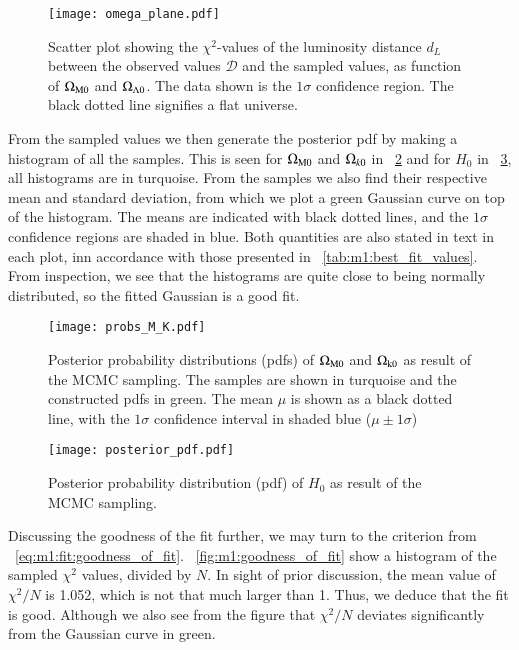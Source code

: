     \begin{figure}
        \texttt{[image: omega\_plane.pdf]}
        \caption{Scatter plot showing the $\chi^2$-values of the luminosity distance $d_L$ between the observed values $\mathcal{D}$ and the sampled values, as function of $\Omega_\mathrm{M0}$ and $\Omega_{\Lambda0}$. The data shown is the $1\sigma$ confidence region. The black dotted line signifies a flat universe. }
        \label{fig:m1:omega_planes}
    \end{figure}
    
    From the sampled values we then generate the posterior pdf by making a histogram of all the samples. This is seen for $\Omega_\mathrm{M0}$ and $\Omega_{k0}$ in ~\cref{fig:m1:posterior_pdf_omega_m_k} and for $H_0$ in ~\cref{fig:m1:posterior_pdf_H0}, all histograms are in turquoise. From the samples we also find their respective mean and standard deviation, from which we plot a green Gaussian curve on top of the histogram. The means are indicated with black dotted lines, and the $1\sigma$ confidence regions are shaded in blue. Both quantities are also stated in text in each plot, inn accordance with those presented in ~\cref{tab:m1:best_fit_values}. From inspection, we see that the histograms are quite close to being normally distributed, so the fitted Gaussian is a good fit. 
    
    \begin{figure}
        \texttt{[image: probs\_M\_K.pdf]}
        \caption{Posterior probability distributions (pdfs) of $\Omega_\mathrm{M0}$ and $\Omega_\mathrm{k0}$ as result of the MCMC sampling. The samples are shown in turquoise and the constructed pdfs in green. The mean $\mu$ is shown as a black dotted line, with the $1\sigma$ confidence interval in shaded blue ($\mu\pm 1\sigma$)}
        \label{fig:m1:posterior_pdf_omega_m_k}
    \end{figure}
    
    \begin{figure}
        \texttt{[image: posterior\_pdf.pdf]}
        \caption{Posterior probability distribution (pdf) of $H_0$ as result of the MCMC sampling.}
        \label{fig:m1:posterior_pdf_H0}
    \end{figure}

    Discussing the goodness of the fit further, we may turn to the criterion from ~\cref{eq:m1:fit:goodness_of_fit}. ~\cref{fig:m1:goodness_of_fit} show a histogram of the sampled $\chi^2$ values, divided by $N$. In sight of prior discussion, the mean value of $\chi^2/N$ is 1.052, which is not that much larger than 1. Thus, we deduce that the fit is good. Although we also see from the figure that $\chi^2/N$ deviates significantly from the Gaussian curve in green.  
    
